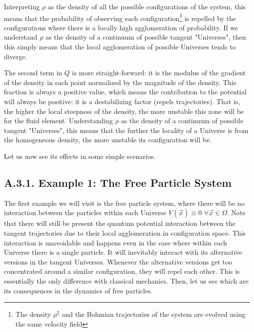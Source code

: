 \documentclass[11pt, a4paper]{article} %
\begin{document}
Interpreting $\rho$ as the density of all the possible configurations of the system, this means that the probability of observing each configuration\footnote{ The density $\rho^2$ and the Bohmian trajectories of the system are evolved using the same velocity field} is repelled by the configurations where there is a locally high agglomeration of probability. If we understand $\rho$ as the density of a continuum of possible tangent "Universes", then this simply means that the local agglomeration of possible Universes tends to diverge.

The second term in $Q$ is more straight-forward: it is the modulus of the gradient of the density in each point normalized by the magnitude of the density. This fraction is always a positive value, which means the contribution to the potential will always be positive: it is a destabilizing factor (repels trajectories). That is, the higher the local steepness of the density, the more unstable this zone will be for the fluid element. Understanding $\rho$ as the density of a continuum of possible tangent "Universes", this means that the further the locality of a Universe is from the homogeneous density, the more unstable its configuration will be.

Let us now see its effects in some simple scenarios.


\subsection*{A.3.1. Example 1: The Free Particle System}
The first example we will visit is the free particle system, where there will be no interaction between the particles within each Universe $V(\vec{x})\equiv 0$ $\forall \vec{x}\in\Omega$. Note that there will still be present the quantum potential interaction between the tangent trajectories due to their local agglomeration in configuration space. This interaction is unavoidable and happens even in the case where within each Universe there is a single particle. It will inevitably interact with its alternative versions in the tangent Universes. Whenever the alternative versions get too concentrated around a similar configuration, they will repel each other. This is essentially the only difference with classical mechanics. Then, let us see which are its consequences in the dynamics of free particles.
\end{document}
